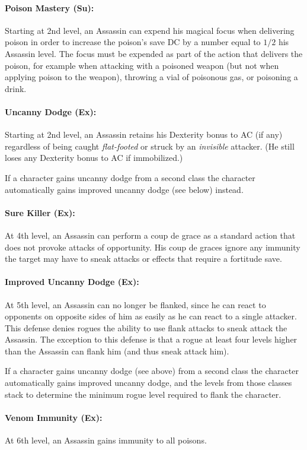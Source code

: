 \paragraph{Poison Mastery (Su):}
Starting at 2nd level, an Assassin can expend his magical focus when delivering poison in order to increase the poison's save DC by a number equal to $1/2$ his Assassin level.
The focus must be expended as part of the action that delivers the poison, for example when attacking with a poisoned weapon (but not when applying poison to the weapon),
throwing a vial of poisonous gas, or poisoning a drink.
\paragraph{Uncanny Dodge (Ex):}
Starting at 2nd level, an Assassin retains his Dexterity bonus to AC (if any) regardless of being caught \emph{flat-footed} or struck by an \emph{invisible} attacker. 
(He still loses any Dexterity bonus to AC if immobilized.)

If a character gains uncanny dodge from a second class the character automatically gains improved uncanny dodge (see below) instead.

\paragraph{Sure Killer (Ex):}
At 4th level, an Assassin can perform a coup de grace as a standard action that does not provoke attacks of opportunity.
His coup de graces ignore any immunity the target may have to sneak attacks or effects that require a fortitude save.
\paragraph{Improved Uncanny Dodge (Ex):}
At 5th level, an Assassin can no longer be flanked, 
since he can react to opponents on opposite sides of him as easily as he can react to a single attacker. 
This defense denies rogues the ability to use flank attacks to sneak attack the Assassin. 
The exception to this defense is that a rogue at least four levels higher than the Assassin can flank him (and thus sneak attack him).

If a character gains uncanny dodge (see above) from a second class the character automatically gains improved uncanny dodge, 
and the levels from those classes stack to determine the minimum rogue level required to flank the character.

\paragraph{Venom Immunity (Ex):}
At 6th level, an Assassin gains immunity to all poisons.

